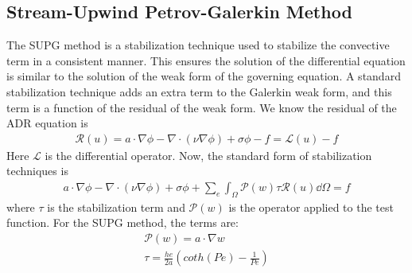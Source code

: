 \documentclass[12pt, oneside]{article}
\begin{document}
\subsection{Stream-Upwind Petrov-Galerkin Method}
The SUPG method is a stabilization technique used to stabilize the convective term in a consistent manner. This ensures the solution of the differential equation is similar to the solution of the weak form of the governing equation. A standard stabilization technique adds an extra term to the Galerkin weak form, and this term is a function of the residual of the weak form. We know the residual of the ADR equation is  
\begin{equation}
       \begin{gathered}
	   \mathcal{R}(u) = a \cdot \nabla \phi - \nabla \cdot (\nu \nabla \phi) + \sigma \phi - f = \mathcal{L}(u) - f
       \end{gathered}
\end{equation}
Here $\mathcal{L}$ is the differential operator. Now, the standard form of stabilization techniques is 
\begin{equation}
       \begin{gathered}
	   a \cdot \nabla \phi - \nabla \cdot (\nu \nabla \phi) + \sigma \phi + \sum_{e} \int_\Omega \mathcal{P}(w)\tau\mathcal{R}(u) \dd \Omega = f
       \end{gathered}
\end{equation}
where $\tau$ is the stabilization term and $\mathcal{P}(w)$ is the operator applied to the test function. For the SUPG method, the terms are:
    \begin{equation}
           \begin{gathered}
	       \mathcal{P}(w) = a \cdot \nabla w \\
	    \tau = \frac{he}{2a} \left( coth(Pe) - \frac{1}{Pe} \right)
           \end{gathered}
    \end{equation}
\end{document}
